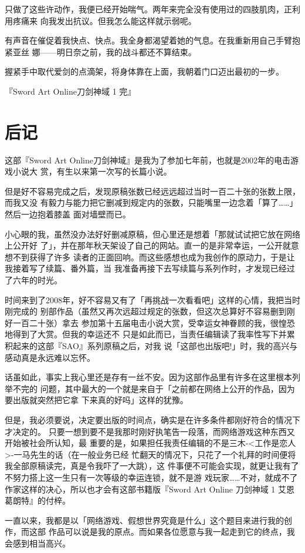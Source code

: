 \documentclass[11pt]{book}
\begin{document}
只做了这些许动作，我便已经开始喘气。两年来完全没有使用过的四肢肌肉，正利用疼痛来
向我发出抗议。但我怎么能这样就示弱呢。

有声音在催促着我快点、快点。我全身都渴望着她的气息。在我重新用自己手臂抱紧亚丝
娜——明日奈之前，我的战斗都还不算结束。

握紧手中取代爱剑的点滴架，将身体靠在上面，我朝着门口迈出最初的一步。

『Sword Art Online刀剑神域 1 完』
\chapter{后记}
\label{sec:org55d2c6d}
这部『Sword Art Online刀剑神域』是我为了参加七年前，也就是2002年的电击游戏小说大
赏，有生以来第一次写的长篇小说。

但是好不容易完成之后，发现原稿张数已经远远超过当时一百二十张的张数上限，而我又没
有毅力与能力把它删减到规定内的张数，只能嘴里一边念着「算了……」然后一边抱着膝盖
面对墙壁而已。

小心眼的我，虽然没办法好好删减原稿，但心里还是想着「那就试试把它放在网络上公开好
了」，并在那年秋天架设了自己的网站。直一的是非常幸运，一公开就意想不到获得了许多
读者的正面回响。而这些感想也成为我创作的原动力，于是让我接着写了续篇、番外篇，当
我准备再接下去写续篇与系列作时，才发现已经过了六年的时光。

时间来到了2008年，好不容易又有了「再挑战一次看看吧」这样的心情，我把当时刚完成的
别部作品（虽然又再次远超过规定的张数，但这次总算好不容易删到刚好一百二十张）拿去
参加第十五届电击小说大赏，受幸运女神眷顾的我，很惶恐地得到了大赏。但我的幸运还不
只是如此而已，当责任编辑读了我率性写下并累积起来的这部『SAO』系列原稿之后，对我
说「这部也出版吧!」时，我的高兴与感动真是永远难以忘怀。

话虽如此，事实上我心里还是存有一丝不安。因为这部作品里有许多在这里根本列举不完的
问题，其中最大的一个就是来自于「之前都在网络上公开的作品，因为要出版就突然把它拿
下来真的好吗」这样的犹豫。

但是，我必须要说，决定要出版的时间点，确实是在许多条件都刚好符合的情况下才决定的。
只要一想到要不是我那时刚好执笔告一段落，而网络游戏这种东西又开始被社会所认知，最
重要的是，如果担任我责任编辑的不是三木-<工作是恋人>-一马先生的话（在一般业务已经
忙翻天的情况下，只花了一个礼拜的时间便将我全部原稿读完，真是令我吓了一大跳），这
件事便不可能会实现，就更让我有了不努力搭上这一生只有一次等级的幸运连锁，就不是游
戏玩家……不对，就成不了作家这样的决心，所以也才会有这部书籍版『Sword Art Online
刀剑神域 1 艾恩葛朗特』的付梓。

一直以来，我都是以「网络游戏、假想世界究竟是什么」这个题目来进行我的创作，而这部
作品可以说是我的原点。而如果各位愿意与我一起走到它的终点，我会感到相当高兴。
\end{document}
